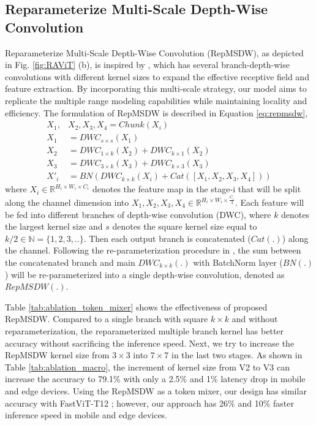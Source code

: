 \subsection{Reparameterize Multi-Scale Depth-Wise Convolution}
Reparameterize Multi-Scale Depth-Wise Convolution (RepMSDW), as depicted in Fig. \ref{fig:RAViT} (b), is inspired by \cite{szegedy2017inception, yu2024inceptionnext}, which has several branch-depth-wise convolutions with different kernel sizes to expand the effective receptive field and feature extraction. By incorporating this multi-scale strategy, our model aims to replicate the multiple range modeling capabilities while maintaining locality and efficiency. The formulation of RepMSDW is described in Equation \ref{eq:repmsdw},
\begin{equation}
    \begin{split}
    X_1, & X_2, X_3, X_4 = Chunk(X_i) \\
    X_1 &= DWC_{s\times s}(X_1) \\
    X_2 &= DWC_{1\times k}(X_2) + DWC_{k\times 1}(X_2) \\
    X_3 &= DWC_{3\times k}(X_3) + DWC_{k\times 3}(X_3) \\
    X'_i &= BN (DWC_{k\times k}(X_i) + Cat([X_1, X_2, X_3, X_4])) 
\end{split}
\label{eq:repmsdw}
\end{equation}
where $X_i\in\mathbb{R}^{H_i\times W_i\times C_i}$ denotes the feature map in the stage-i that will be split along the channel dimension into $X_1, X_2, X_3, X_4 \in \mathbb{R}^{H_i\times W_i\times \frac{C_i}{4}}$. Each feature will be fed into different branches of depth-wise convolution (DWC), where $k$ denotes the largest kernel size and $s$ denotes the square kernel size equal to $k/2 \in \mathbb{N}=\{1,2,3,..\} $. Then each output branch is concatenated ($Cat(.)$) along the channel. Following the re-parameterization procedure in \cite{ding2021repvgg}, the sum between the concatenated branch and main $DWC_{k\times k}(.)$ with BatchNorm layer ($BN(.)$) will be re-parameterized into a single depth-wise convolution, denoted as $RepMSDW(.)$.

Table \ref{tab:ablation_token_mixer} shows the effectiveness of proposed RepMSDW. Compared to a single branch with square $k \times k$ and without reparameterization, the reparameterized multiple branch kernel has better accuracy without sacrificing the inference speed. Next, we try to increase the RepMSDW kernel size from $3 \times 3$ into $7 \times 7$ in the last two stages. As shown in Table \ref{tab:ablation_macro}, the increment of kernel size from V2 to V3 can increase the accuracy to 79.1\% with only a 2.5\% and 1\% latency drop in mobile and edge devices. Using the RepMSDW as a token mixer, our design has similar accuracy with FastViT-T12 \cite{vasu2023fastvit}; however, our approach has 26\% and 10\% faster inference speed in mobile and edge devices.

